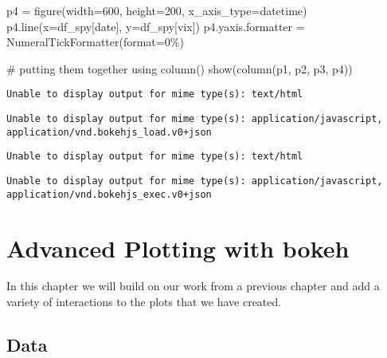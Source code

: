 \documentclass[
  letterpaper,
  DIV=11,
  numbers=noendperiod]{scrreprt}
\newenvironment{Shaded}{\begin{snugshade}}{\end{snugshade}}
\newcommand{\BuiltInTok}[1]{\textcolor[rgb]{0.00,0.23,0.31}{#1}}
\newcommand{\CommentTok}[1]{\textcolor[rgb]{0.37,0.37,0.37}{#1}}
\newcommand{\DecValTok}[1]{\textcolor[rgb]{0.68,0.00,0.00}{#1}}
\newcommand{\NormalTok}[1]{\textcolor[rgb]{0.00,0.23,0.31}{#1}}
\newcommand{\OperatorTok}[1]{\textcolor[rgb]{0.37,0.37,0.37}{#1}}
\newcommand{\StringTok}[1]{\textcolor[rgb]{0.13,0.47,0.30}{#1}}
\begin{document}
\begin{Shaded}
\begin{Highlighting}[]
\NormalTok{p4 }\OperatorTok{=}\NormalTok{ figure(width}\OperatorTok{=}\DecValTok{600}\NormalTok{, height}\OperatorTok{=}\DecValTok{200}\NormalTok{, x\_axis\_type}\OperatorTok{=}\StringTok{\textquotesingle{}datetime\textquotesingle{}}\NormalTok{)}
\NormalTok{p4.line(x}\OperatorTok{=}\NormalTok{df\_spy[}\StringTok{\textquotesingle{}date\textquotesingle{}}\NormalTok{], y}\OperatorTok{=}\NormalTok{df\_spy[}\StringTok{\textquotesingle{}vix\textquotesingle{}}\NormalTok{])}
\NormalTok{p4.yaxis.formatter }\OperatorTok{=}\NormalTok{ NumeralTickFormatter(}\BuiltInTok{format}\OperatorTok{=}\StringTok{\textquotesingle{}0\%\textquotesingle{}}\NormalTok{)}

\CommentTok{\# putting them together using column()}
\NormalTok{show(column(p1, p2, p3, p4))}
\end{Highlighting}
\end{Shaded}

\begin{verbatim}
Unable to display output for mime type(s): text/html
\end{verbatim}

\begin{verbatim}
Unable to display output for mime type(s): application/javascript, application/vnd.bokehjs_load.v0+json
\end{verbatim}

\begin{verbatim}
Unable to display output for mime type(s): text/html
\end{verbatim}

\begin{verbatim}
Unable to display output for mime type(s): application/javascript, application/vnd.bokehjs_exec.v0+json
\end{verbatim}

\hypertarget{advanced-plotting-with-bokeh}{%
\chapter{\texorpdfstring{Advanced Plotting with
\textbf{bokeh}}{Advanced Plotting with bokeh}}\label{advanced-plotting-with-bokeh}}

In this chapter we will build on our work from a previous chapter and
add a variety of interactions to the plots that we have created.

\hypertarget{data-1}{%
\section{Data}\label{data-1}}
\end{document}
